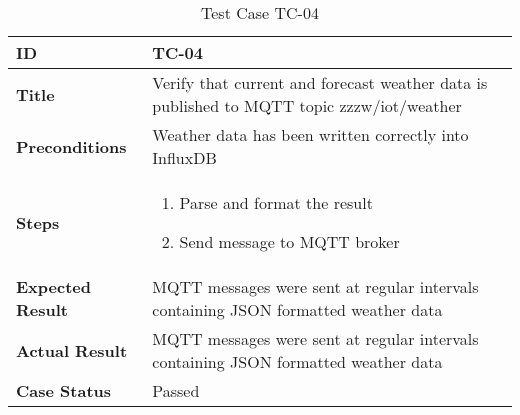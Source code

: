 \begin{table}[ht]
\centering
\begin{tabular}{|>{\raggedright\arraybackslash}p{4cm}|p{10cm}|}
\hline
\textbf{ID} & TC-04 \\
\hline
\textbf{Title} & Verify that current and forecast weather data is published to MQTT topic zzzw/iot/weather \\
\hline
\textbf{Preconditions} & Weather data has been written correctly into InfluxDB \\
\hline
\textbf{Steps} & \vspace{-20pt}\begin{enumerate}
    \item Parse and format the result
    \item Send message to MQTT broker
\end{enumerate} \\
\hline
\textbf{Expected Result} & MQTT messages were sent at regular intervals containing JSON formatted weather data \\
\hline
\textbf{Actual Result} & MQTT messages were sent at regular intervals containing JSON formatted weather data \\
\hline
\textbf{Case Status} & Passed \\
\hline
\end{tabular}
\caption{Test Case TC-04}
\label{tab:tc4}
\end{table}